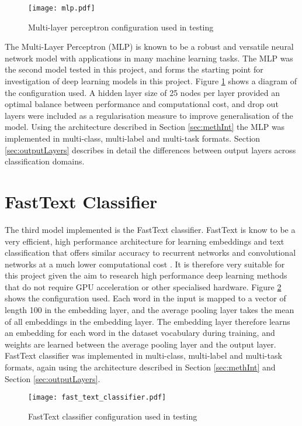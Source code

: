\documentclass[Dissertation.tex]{subfiles}
\begin{document}
\begin{figure}
	\centering
	\texttt{[image: mlp.pdf]}
	\caption{Multi-layer perceptron configuration used in testing}
	\label{fig:mlp}
\end{figure}
The Multi-Layer Perceptron (MLP) is known to be a robust and versatile neural network model \cite{castellaniCompetitiveCoevolutionMultilayer2018} with applications in many machine learning tasks. The MLP was the second model tested in this project, and forms the starting point for investigation of deep learning models in this project. Figure \ref{fig:mlp} shows a diagram of the configuration used. A hidden layer size of 25 nodes per layer provided an optimal balance between performance and computational cost, and drop out layers were included as a regularisation measure to improve generalisation of the model. Using the architecture described in Section \ref{sec:methInt} the MLP was implemented in multi-class, multi-label and multi-task formats. Section \ref{sec:outputLayers} describes in detail the differences between output layers across classification domains.

\section{FastText Classifier}
The third model implemented is the FastText classifier. FastText is know to be a very efficient, high performance architecture for learning embeddings and text classification that offers similar accuracy to recurrent networks and convolutional  networks at a much lower computational cost \cite{joulinBagTricksEfficient2016}. It is therefore very suitable for this project given the aim to research high performance deep learning methods that do not require GPU acceleration or other specialised hardware. Figure \ref{fig:fastTextClassifier} shows the configuration used. Each word in the input is mapped to a vector of length 100 in the embedding layer, and the average pooling layer takes the mean of all embeddings in the embedding layer. The embedding layer therefore learns an embedding for each word in the dataset vocabulary during training, and weights are learned between the average pooling layer and the output layer. FastText classifier was implemented in multi-class, multi-label and multi-task formats, again using the architecture described in Section \ref{sec:methInt} and Section \ref{sec:outputLayers}.

\begin{figure}\centering
	\texttt{[image: fast\_text\_classifier.pdf]}
	\caption{FastText classifier configuration used in testing}
	\label{fig:fastTextClassifier}
\end{figure}
\end{document}
